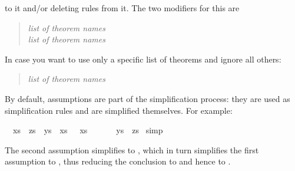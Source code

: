 \begin{isabellebody}
\begin{isamarkuptext}
to it and/or deleting rules from it. The two modifiers for this are
\begin{quote}
 \textit{list of theorem names}\\
 \textit{list of theorem names}
\end{quote}
In case you want to use only a specific list of theorems and ignore all
others:
\begin{quote}
 \textit{list of theorem names}
\end{quote}%
\end{isamarkuptext}%
%
%
\begin{isamarkuptext}%
By default, assumptions are part of the simplification process: they are used
as simplification rules and are simplified themselves. For example:%
\end{isamarkuptext}%
\ {\isachardoublequote}{\isasymlbrakk}\ xs\ {\isacharat}\ zs\ {\isacharequal}\ ys\ {\isacharat}\ xs{\isacharsemicolon}\ {\isacharbrackleft}{\isacharbrackright}\ {\isacharat}\ xs\ {\isacharequal}\ {\isacharbrackleft}{\isacharbrackright}\ {\isacharat}\ {\isacharbrackleft}{\isacharbrackright}\ {\isasymrbrakk}\ {\isasymLongrightarrow}\ ys\ {\isacharequal}\ zs{\isachardoublequote}\isanewline
{}\ simp\isanewline
{}%
\begin{isamarkuptext}%
\noindent
The second assumption simplifies to , which in turn
simplifies the first assumption to , thus reducing the
conclusion to  and hence to .


\end{isamarkuptext}
\end{isabellebody}
